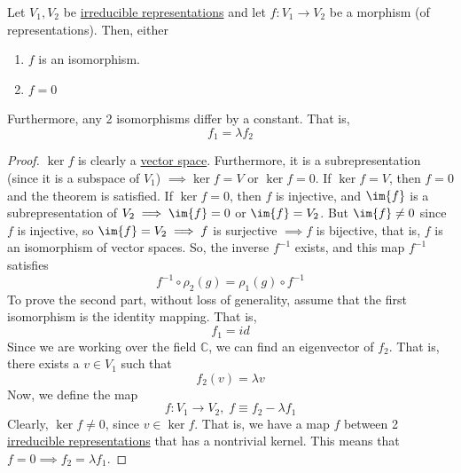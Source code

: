   \begin{lemma}
    \label{thm:schurs-lemma}
    Let $V_1, V_2$ be \hyperref[def:irreducible-representation]{irreducible representations} and let $f: V_1 \to V_2$ be a morphism (of representations). Then, either
    \begin{enumerate}
      \item $f$ is an isomorphism. 
      \item $f = 0$
    \end{enumerate}
    Furthermore, any 2 isomorphisms differ by a constant. That is, 
    \begin{equation}
      f_1 = \lambda f_2
    \end{equation}
  \end{lemma}
  \begin{proof}
    $\ker{f}$ is clearly a \hyperref[def:vector-space]{vector space}. Furthermore, it is a subrepresentation (since it is a subspace of $V_1$) $\implies \ker{f} = V$ or $\ker{f} = 0$. If $\ker{f} = V$, then $f = 0$ and the theorem is satisfied. If $\ker{f} = 0$, then $f$ is injective, and $\im{f}$ is a subrepresentation of $V_2 \implies \im{f} = 0$ or $\im{f} = V_2$. But $\im{f} \neq 0$ since $f$ is injective, so $\im{f} = V_2 \implies f$ is surjective $\implies f$ is bijective, that is, $f$ is an isomorphism of vector spaces. So, the inverse $f^{-1}$ exists, and this map $f^{-1}$ satisfies
    \begin{equation}
      f^{-1} \circ \rho_2(g) = \rho_1 (g) \circ f^{-1}
    \end{equation}
    To prove the second part, without loss of generality, assume that the first isomorphism is the identity mapping. That is, 
    \begin{equation}
      f_1 = id
    \end{equation}
    Since we are working over the field $\mathbb{C}$, we can find an eigenvector of $f_2$. That is, there exists a $v \in V_1$ such that 
    \begin{equation}
      f_2 (v) = \lambda v
    \end{equation}
    Now, we define the map
    \begin{equation}
      f: V_1 \to V_2, \; f \equiv f_2 - \lambda f_1
    \end{equation}
    Clearly, $\ker{f} \neq 0$, since $v \in \ker{f}$. That is, we have a map $f$ between 2 \hyperref[def:irreducible-representation]{irreducible representations} that has a nontrivial kernel. This means that $f = 0 \implies f_2 = \lambda f_1$.  
  \end{proof}

